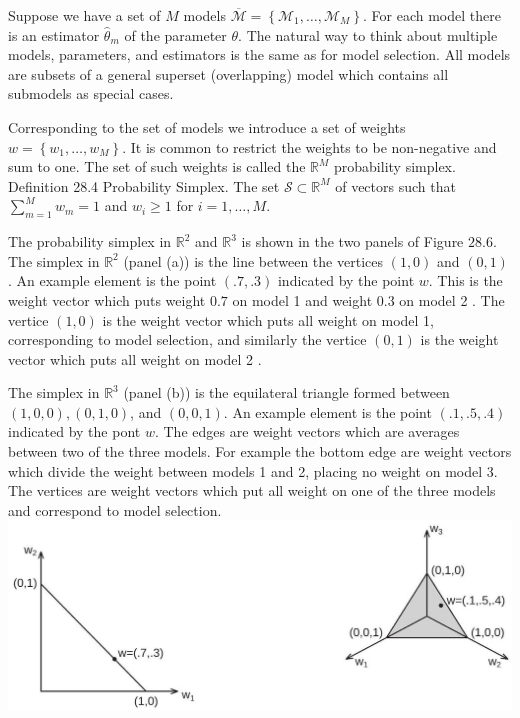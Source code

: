 \documentclass[10pt]{article}
\begin{document}
Suppose we have a set of $M$ models $\overline{\mathscr{M}}=\left\{\mathcal{M}_{1}, \ldots, \mathcal{M}_{M}\right\}$. For each model there is an estimator $\widehat{\theta}_{m}$ of the parameter $\theta$. The natural way to think about multiple models, parameters, and estimators is the same as for model selection. All models are subsets of a general superset (overlapping) model which contains all submodels as special cases.

Corresponding to the set of models we introduce a set of weights $w=\left\{w_{1}, \ldots, w_{M}\right\}$. It is common to restrict the weights to be non-negative and sum to one. The set of such weights is called the $\mathbb{R}^{M}$ probability simplex. Definition 28.4 Probability Simplex. The set $\mathscr{S} \subset \mathbb{R}^{M}$ of vectors such that $\sum_{m=1}^{M} w_{m}=1$ and $w_{i} \geq 1$ for $i=1, \ldots, M$.

The probability simplex in $\mathbb{R}^{2}$ and $\mathbb{R}^{3}$ is shown in the two panels of Figure $28.6$. The simplex in $\mathbb{R}^{2}$ (panel (a)) is the line between the vertices $(1,0)$ and $(0,1)$. An example element is the point $(.7, .3)$ indicated by the point $w$. This is the weight vector which puts weight $0.7$ on model 1 and weight $0.3$ on model 2 . The vertice $(1,0)$ is the weight vector which puts all weight on model 1, corresponding to model selection, and similarly the vertice $(0,1)$ is the weight vector which puts all weight on model 2 .

The simplex in $\mathbb{R}^{3}$ (panel (b)) is the equilateral triangle formed between $(1,0,0),(0,1,0)$, and $(0,0,1)$. An example element is the point $(.1, .5, .4)$ indicated by the pont $w$. The edges are weight vectors which are averages between two of the three models. For example the bottom edge are weight vectors which divide the weight between models 1 and 2, placing no weight on model 3. The vertices are weight vectors which put all weight on one of the three models and correspond to model selection.\\

\includegraphics[max width=\textwidth]{2022_10_23_101d59f261a704807a3bg-36}
\end{document}
